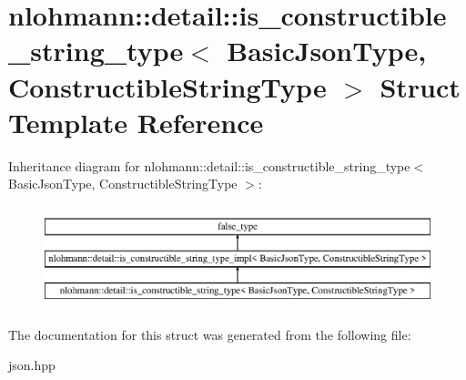 \hypertarget{structnlohmann_1_1detail_1_1is__constructible__string__type}{}\section{nlohmann\+:\+:detail\+:\+:is\+\_\+constructible\+\_\+string\+\_\+type$<$ Basic\+Json\+Type, Constructible\+String\+Type $>$ Struct Template Reference}
\label{structnlohmann_1_1detail_1_1is__constructible__string__type}
Inheritance diagram for nlohmann\+:\+:detail\+:\+:is\+\_\+constructible\+\_\+string\+\_\+type$<$ Basic\+Json\+Type, Constructible\+String\+Type $>$\+:\begin{figure}[H]
\begin{center}
\leavevmode
\includegraphics[height=3.000000cm]{structnlohmann_1_1detail_1_1is__constructible__string__type}
\end{center}
\end{figure}


The documentation for this struct was generated from the following file\+:\begin{DoxyCompactItemize}
\item 
json.\+hpp\end{DoxyCompactItemize}

